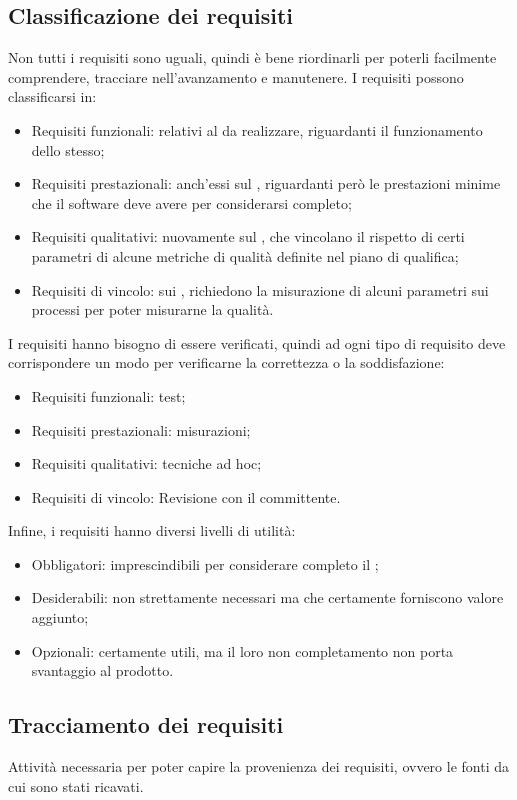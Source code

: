 \documentclass[../main]{subfiles}
\begin{document}
\subsection{Classificazione dei requisiti}
Non tutti i requisiti sono uguali, quindi è bene riordinarli per poterli facilmente comprendere, tracciare nell'avanzamento e manutenere.
I requisiti possono classificarsi in:
\begin{itemize}
    \item Requisiti funzionali: relativi al  da realizzare, riguardanti il funzionamento dello stesso;
    \item Requisiti prestazionali: anch'essi sul , riguardanti però le prestazioni minime che il software deve avere per considerarsi completo;
    \item Requisiti qualitativi: nuovamente sul , che vincolano il rispetto di certi parametri di alcune metriche di qualità definite nel piano di qualifica;
    \item Requisiti di vincolo: sui , richiedono la misurazione di alcuni parametri sui processi per poter misurarne la qualità.
\end{itemize}
I requisiti hanno bisogno di essere verificati, quindi ad ogni tipo di requisito deve corrispondere un modo per verificarne la correttezza o la soddisfazione:
\begin{itemize}
    \item Requisiti funzionali: test;
    \item Requisiti prestazionali: misurazioni;
    \item Requisiti qualitativi: tecniche ad hoc;
    \item Requisiti di vincolo: Revisione con il committente.
\end{itemize}
Infine, i requisiti hanno diversi livelli di utilità:
\begin{itemize}
    \item Obbligatori: imprescindibili per considerare completo il ;
    \item Desiderabili: non strettamente necessari ma che certamente forniscono valore aggiunto;
    \item Opzionali: certamente utili, ma il loro non completamento non porta svantaggio al prodotto.
\end{itemize}
\subsection{Tracciamento dei requisiti}
Attività necessaria per poter capire la provenienza dei requisiti, ovvero le fonti da cui sono stati ricavati.
\end{document}
